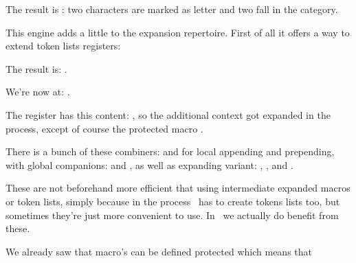 \startbuffer
{}
\stopbuffer

\typebuffer[option=TEX]

The result is \quotation {\tt\inlinebuffer}: two characters are marked as \quote
{letter} and two fall in the  category.

\stopsection

\startsection[title={\LUATEX\ primitives}]

This engine adds a little to the expansion repertoire. First of all it offers a
way to extend token lists registers:

\startbuffer
\def\MyMacroA{a}
\def\MyMacroB{b}
\normalprotected{}
\scratchtoks{\MyMacroA\MyMacroB}
\stopbuffer

\typebuffer[option=TEX] \getbuffer

The result is: \MyShow.

\startbuffer
\toksapp\scratchtoks{\MyMacroA\MyMacroB}
\stopbuffer

\typebuffer[option=TEX] \getbuffer

We're now at: \MyShow.

\startbuffer
\etoksapp\scratchtoks{\MyMacroA\space\MyMacroB\space\MyMacroC}
\stopbuffer

\typebuffer[option=TEX] \getbuffer

The register has this content: \MyShow, so the additional context got expanded in
the process, except of course the protected macro \type {\MyMacroC}.

There is a bunch of these combiners: \type {\toksapp} and \type {\tokspre} for
local appending and prepending, with global companions: \type {\gtoksapp} and
\type {\gtokspre}, as well as expanding variant: \type {\etoksapp}, \type
{\etokspre}, \type {\xtoksapp} and \type {\xtokspre}.

These are not beforehand more efficient that using intermediate expanded macros
or token lists, simply because in the process \TEX\ has to create tokens lists
too, but sometimes they're just more convenient to use. In \CONTEXT\ we actually
do benefit from these.

\stopsection

\startsection[title={\LUAMETATEX\ primitives}]

We already saw that macro's can be defined protected which means that

